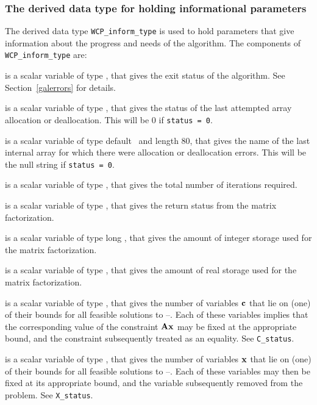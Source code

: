 \documentclass{galahad}
\newcommand{\packagename}{WCP}
\begin{document}

\subsubsection{The derived data type for holding informational
 parameters}\label{typeinform}
The derived data type 
{\tt \packagename\_inform\_type} 
is used to hold parameters that give information about the progress and needs 
of the algorithm. The components of 
{\tt \packagename\_inform\_type} 
are:

\begin{description}

 is a scalar variable of type \integer, that gives the
exit status of the algorithm. 
See Section~\ref{galerrors}
for details.

 is a scalar variable of type \integer, that gives
the status of the last attempted array allocation or deallocation.
This will be 0 if {\tt status = 0}.

 is a scalar variable of type default \character\
and length 80, that  gives the name of the last internal array 
for which there were allocation or deallocation errors.
This will be the null string if {\tt status = 0}. 

 is a scalar variable of type \integer, that gives the
total number of iterations required.

 is a scalar variable of type \integer, that 
gives the return status from the matrix factorization.

 is a scalar variable of type long
\integer, that gives the amount of integer storage used for the matrix 
factorization.

 is a scalar variable of type \longinteger, 
that gives the amount of real storage used for the matrix factorization.

 is a scalar variable of type \integer, that gives the
number of variables ${\mathbf{c}}$ that lie on (one) of their bounds for all
feasible solutions to \req{prim}--\req{boundary}. Each of these variables 
implies that the corresponding value of the constraint ${\mathbf{A}} {\mathbf{x}}$ may
be fixed at the appropriate bound, and the constraint subsequently treated as
an equality. See {\tt C\_status}.

 is a scalar variable of type \integer, that gives the
number of variables ${\mathbf{x}}$ that lie on (one) of their bounds for all
feasible solutions to \req{prim}--\req{boundary}. Each of these variables 
may then be fixed at its appropriate bound, and the variable subsequently
removed from the problem.
See {\tt X\_status}.


\end{description}
\end{document}
